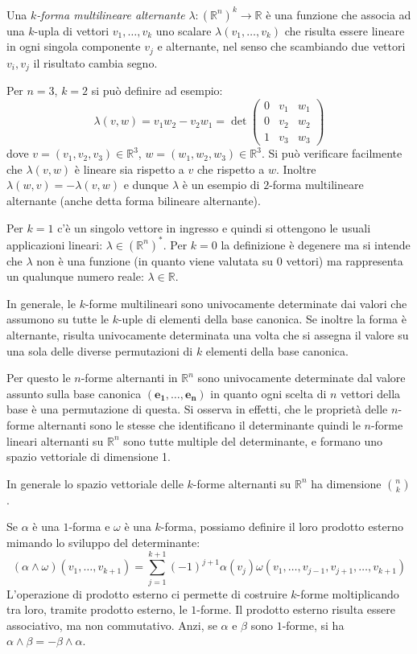 \documentclass[italian,a4paper]{scrartcl}
\newcommand{\RR}{{\mathbb R}}
\renewcommand{\vec}{\mathbf}
\begin{document}
Una \emph{$k$-forma multilineare alternante} $\lambda\colon (\RR^n)^k \to \RR$ è
una funzione che associa ad una $k$-upla di vettori $v_1,\dots,v_k$
uno scalare $\lambda(v_1,\dots, v_k)$ che risulta essere lineare in
ogni singola componente $v_j$ e alternante, nel senso che scambiando
due vettori $v_i, v_j$ il risultato cambia segno.

\begin{example}
Per $n=3$, $k=2$ si può definire ad esempio:
\[
 \lambda(v, w) = v_1w_2 - v_2w_1
= \det\begin{pmatrix}
0 & v_1 & w_1\\
0 & v_2 & w_2\\
1 & v_3 & w_3
\end{pmatrix}
\]
dove $v=(v_1,v_2,v_3) \in \RR^3$, $w=(w_1,w_2,w_3) \in \RR^3$. Si può
verificare facilmente che $\lambda(v,w)$ è lineare sia rispetto a $v$
che rispetto a $w$. Inoltre $\lambda(w,v) = -\lambda(v,w)$ e dunque
$\lambda$ è un esempio di $2$-forma multilineare alternante (anche
detta forma bilineare alternante).
\end{example}

Per $k=1$ c'è un singolo vettore in ingresso e quindi si ottengono le
usuali applicazioni lineari: $\lambda \in (\RR^n)^*$. Per $k=0$ la definizione è
degenere ma si intende che $\lambda$ non è una funzione (in quanto
viene valutata su $0$ vettori) ma rappresenta un qualunque numero reale:
$\lambda\in \mathbb R$.

In generale,
le $k$-forme multilineari sono univocamente determinate dai valori che
assumono su tutte le $k$-uple di elementi della base canonica. Se
inoltre la forma è alternante, risulta univocamente determinata una
volta che si assegna il valore su una sola delle diverse permutazioni
di $k$ elementi della base canonica.

Per questo le $n$-forme alternanti in
$\RR^n$ sono univocamente determinate dal valore assunto sulla base
canonica $(\vec {e_1},\dots, \vec{e_n})$ in quanto ogni scelta di $n$
vettori della base è una permutazione di questa.
Si osserva in effetti, che le proprietà
delle $n$-forme alternanti sono le stesse che identificano il determinante
quindi le
$n$-forme lineari alternanti su $\RR^n$ sono tutte multiple del
determinante, e formano uno spazio vettoriale di dimensione 1.

In generale lo spazio
vettoriale delle $k$-forme alternanti su $\RR^n$ ha dimensione ${n
  \choose k}$.

Se $\alpha$ è una $1$-forma e $\omega$ è una $k$-forma, possiamo
definire il loro prodotto esterno mimando lo sviluppo del
determinante:
\[
  (\alpha \wedge \omega)(v_1,\dots,v_{k+1}) 
  = \sum_{j=1}^{k+1}
(-1)^{j+1}\alpha(v_j) \omega(v_1,\dots, v_{j-1},v_{j+1},\dots,v_{k+1})
\]
L'operazione di prodotto esterno ci permette di costruire
$k$-forme moltiplicando tra loro, tramite prodotto esterno, le
$1$-forme. Il prodotto esterno risulta essere associativo, ma non
commutativo. Anzi, se $\alpha$ e $\beta$ sono $1$-forme, si ha
$\alpha\wedge \beta  = - \beta \wedge \alpha$.
\end{document}
